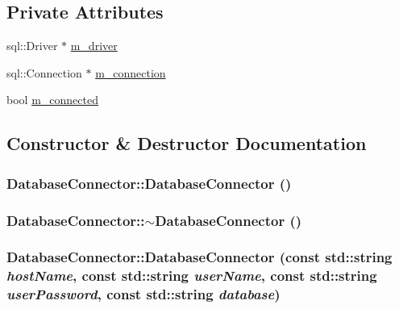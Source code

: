 \subsection*{Private Attributes}
\begin{DoxyCompactItemize}
\item 
sql::Driver $\ast$ \hyperlink{classDatabaseConnector_aacae9f4fcb377b458e210f8aa87d0759}{m\_\-driver}
\item 
sql::Connection $\ast$ \hyperlink{classDatabaseConnector_a82c3e58f461abecf645352205dc7d83d}{m\_\-connection}
\item 
bool \hyperlink{classDatabaseConnector_aa6eff9e87635230d6b6aaa675312aaf1}{m\_\-connected}
\end{DoxyCompactItemize}


\subsection{Constructor \& Destructor Documentation}
\hypertarget{classDatabaseConnector_af371bd32e0f186f1de9fa487872eb1c1}{
\subsubsection[{DatabaseConnector}]{\setlength{\rightskip}{0pt plus 5cm}DatabaseConnector::DatabaseConnector ()}}
\label{classDatabaseConnector_af371bd32e0f186f1de9fa487872eb1c1}
\hypertarget{classDatabaseConnector_a4312f4426fbfd8519bea54c919c27c6a}{
\subsubsection[{$\sim$DatabaseConnector}]{\setlength{\rightskip}{0pt plus 5cm}DatabaseConnector::$\sim$DatabaseConnector ()}}
\label{classDatabaseConnector_a4312f4426fbfd8519bea54c919c27c6a}
\hypertarget{classDatabaseConnector_a502670eae16b1bcf0e102b337b27217c}{
\subsubsection[{DatabaseConnector}]{\setlength{\rightskip}{0pt plus 5cm}DatabaseConnector::DatabaseConnector (const std::string {\em hostName}, \/  const std::string {\em userName}, \/  const std::string {\em userPassword}, \/  const std::string {\em database})}}
\label{classDatabaseConnector_a502670eae16b1bcf0e102b337b27217c}


